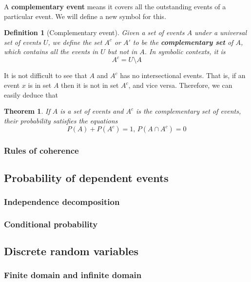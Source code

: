 \documentclass[12pt]{article}
\newtheorem{definition}{Definition}[section]
\newtheorem*{theorem}{Theorem}
\begin{document}
    A \textbf{complementary event} means it covers all the outstanding events of a particular event. We will define a new symbol for this.

    \begin{definition}[Complementary event]
        Given a set of events $A$ under a universal set of events $U$, we define the set $A^c$ or $A'$ to be the \textbf{complementary set} of $A$, which contains all the events in $U$ but not in $A$. In symbolic contexts, it is \[A^c = U\setminus A\]
    \end{definition}

    It is not difficult to see that $A$ and $A^c$ has no intersectional events. That is, if an event $x$ is in set $A$ then it is not in set $A^c$, and vice versa. Therefore, we can easily deduce that

    \begin{theorem}
        If $A$ is a set of events and $A^c$ is the complementary set of events, their probability satisfies the equations \[P(A)+P(A^c)=1,\, P(A\cap A^c)=0\]
    \end{theorem}

    \subsubsection*{Rules of coherence}

    \subsection{Probability of dependent events}

    \subsubsection*{Independence decomposition}

    \subsubsection*{Conditional probability}

    \subsection{Discrete random variables}

    \subsubsection*{Finite domain and infinite domain}
\end{document}
